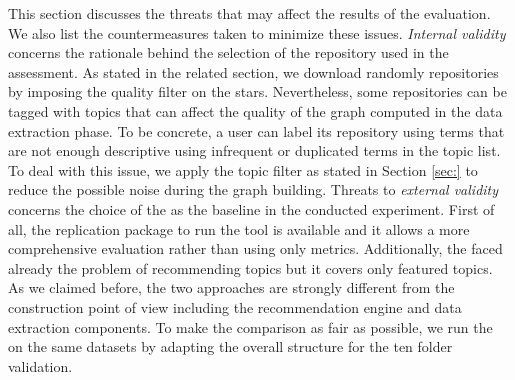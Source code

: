 This section discusses the threats that may affect the results of the evaluation. We also list the countermeasures taken to minimize these issues.
\emph{Internal validity} concerns the rationale behind the selection of the \GH repository used in the assessment. As stated in the related section, we download randomly repositories by imposing the quality filter on the stars. Nevertheless, some repositories can be tagged with topics that can affect the quality of the graph computed in the data extraction phase. To be concrete, a user can label its repository using terms that are not enough descriptive \ie using infrequent or duplicated terms in the topic list. To deal with this issue, we apply the topic filter as stated in Section \ref{sec:} to reduce the possible noise during the graph building.
Threats to \emph{external validity} concerns the choice of the \MNB as the baseline in the conducted experiment. First of all, the replication package to run the tool is available and it allows a more comprehensive evaluation rather than using only metrics. Additionally, the \MNB faced already the problem of recommending \GH topics but it covers only featured topics. As we claimed before, the two approaches are strongly different from the construction point of view including the recommendation engine and data extraction components. To make the comparison as fair as possible, we run the \MNB on the same datasets by adapting the overall structure for the ten folder validation.